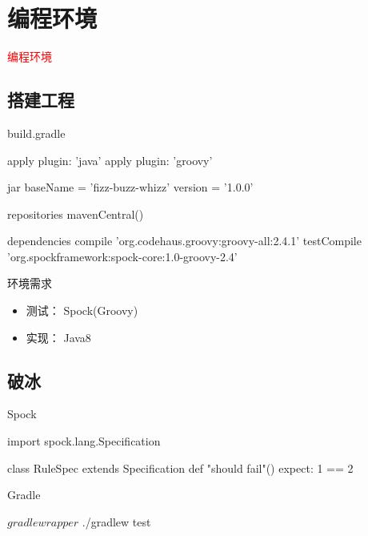 \section{编程环境}
\label{sec:prog-env}

\begin{frame}
  \begin{center}
    \Huge{\textcolor{red}{编程环境}}
  \end{center}
\end{frame}

\subsection{搭建工程}

\begin{frame}[fragile]{build.gradle}
  \begin{scala}
apply plugin: 'java'
apply plugin: 'groovy'

jar {
  baseName = 'fizz-buzz-whizz'
  version = '1.0.0'
}

repositories {
  mavenCentral()
}

dependencies {
  compile 'org.codehaus.groovy:groovy-all:2.4.1'
  testCompile 'org.spockframework:spock-core:1.0-groovy-2.4'
}
  \end{scala}
\end{frame}

\begin{frame}[fragile]{环境需求}
  \begin{block}{}
  \begin{itemize}
    \item \alert{测试：} Spock(Groovy)
    \item \alert{实现：} Java8
  \end{itemize}
  \end{block}
\end{frame}

\subsection{破冰}

\begin{frame}[fragile]{Spock}
  \begin{scala}
import spock.lang.Specification
  
class RuleSpec extends Specification {
  def "should fail"() {
    expect:
    1 == 2
  }
}
  \end{scala}
\end{frame}

\begin{frame}[fragile]{Gradle}
  \begin{scala}
$ gradle wrapper
$ ./gradlew test 
  \end{scala}
\end{frame}
